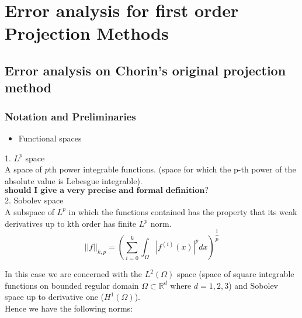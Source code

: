 
\chapter{Error analysis for first order Projection Methods}
\label{appendix1}

\newpage

\section{Error analysis on Chorin's original projection method}

\subsection{Notation and Preliminaries}
\begin{itemize}
\item Functional spaces
\end{itemize}
1. $\textit{L}^p$ space\\
A space of $p$th power integrable functions. (space for which the p-th power of the absolute value is Lebesgue integrable). $\textbf{should I give a very precise and formal definition?}$\\

2. Sobolev space\\
A subspace of $\textit{L}^p$ in which the functions contained has the property that its weak derivatives up to kth order has finite $\textit{L}^p$ norm.
\begin{equation}
||f||_{k,p} = (\sum^k_{i=0} \int_{\Omega} |f^{(i)} (x)|^p dx)^{\dfrac{1}{p}} 
\end{equation}

In this case we are concerned with the $\textit{L}^2 (\Omega) $ space (space of square integrable functions on bounded regular domain $\Omega \subset \mathbb{R}^d$ where $d=1,2,3$) and Sobolev space up to derivative one ($\textit{H}^1 (\Omega)$).\\
Hence we have the following norms:


